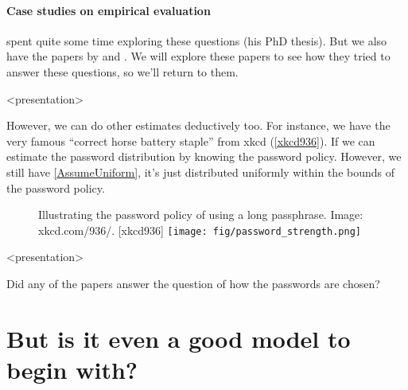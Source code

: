 \paragraph{Case studies on empirical evaluation}

\Textcite{GuessingHumanChosenSecrets2012} spent quite some time exploring these 
questions (his PhD thesis).
But we also have the papers by
\textcite{OfPasswordsAndPeople} and
\textcite{CanLongPasswordsBeSecureAndUsable}.
We will explore these papers to see how they tried to answer these questions, 
so we'll return to them.

\begin{frame}<presentation>
  \begin{example}
  \end{example}

  \begin{example}
  \end{example}
\end{frame}

However, we can do other estimates deductively too.
For instance, we have the very famous \enquote{correct horse battery staple} 
from xkcd (\cref{xkcd936}).
If we can estimate the password distribution by knowing the password policy.
However, we still have \cref{AssumeUniform}, it's just distributed uniformly 
within the bounds of the password policy.

\begin{frame}
  \begin{figure}[h]
    \begin{sidecaption}[xkcd 936]{%
      Illustrating the password policy of using a long passphrase.
      Image: xkcd.com/936/.
    }[xkcd936]
      \texttt{[image: fig/password\_strength.png]}
    \end{sidecaption}
  \end{figure}
\end{frame}

\begin{frame}<presentation>
  \begin{exercise}
    Did any of the papers answer the question of how the passwords are chosen?
  \end{exercise}
\end{frame}

\section[Is it a good model?]{But is it even a good model to begin with?}

